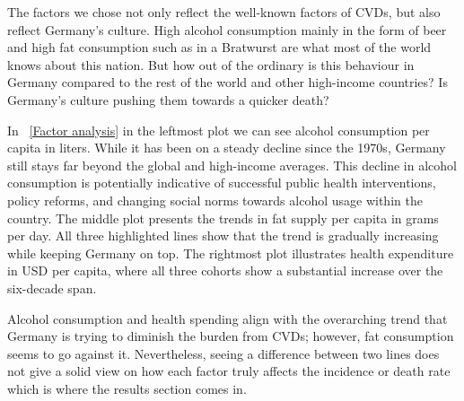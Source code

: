 The factors we chose not only reflect the well-known factors of CVDs, but also reflect Germany's culture. High alcohol consumption mainly in the form of beer and high fat consumption such as in a Bratwurst are what most of the world knows about this nation. But how out of the ordinary is this behaviour in Germany compared to the rest of the world and other high-income countries? Is Germany's culture pushing them towards a quicker death?


In \figurename~\ref{Factor analysis} in the leftmost plot we can see alcohol consumption per capita in liters. While it has been on a steady decline since the 1970s, Germany still stays far beyond the global and high-income averages. This decline in alcohol consumption is potentially indicative of successful public health interventions, policy reforms, and changing social norms towards alcohol usage within the country. The middle plot presents the trends in fat supply per capita in grams per day. All three highlighted lines show that the trend is gradually increasing while keeping Germany on top. The rightmost plot illustrates health expenditure in USD per capita, where all three cohorts show a substantial increase over the six-decade span.

Alcohol consumption and health spending align with the overarching trend that Germany is trying to diminish the burden from CVDs; however, fat consumption seems to go against it. Nevertheless, seeing a difference between two lines does not give a solid view on how each factor truly affects the incidence or death rate which is where the results section comes in.